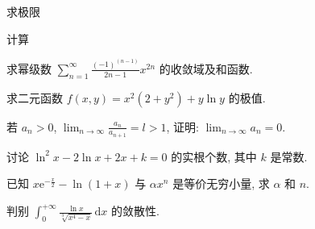 \par{}
\par{}
求极限\par
\nopagebreak[4]
\par{}
\par{}
计算\par
\nopagebreak[4]
\par{}
求幂级数 $\sum_{n=1}^{\infty} \frac{(-1)^{(n-1)}}{2n-1} x^{2n}$ 的收敛域及和函数.\par
\par{}
求二元函数 $f(x, y) = x^{2}(2 + y^{2}) + y \ln y$ 的极值.\par
\par{}
若 $a_{n} > 0$, $\lim_{n\to \infty}\frac{a_n}{a_{n + 1}} = l > 1$, 证明: $\lim_{n\to \infty}a_n = 0$.\par
\par{}
讨论 $\ln^2 x - 2\ln x + 2x + k = 0$ 的实根个数, 其中 $k$ 是常数.\par
\par{}
已知 $x \mathrm{e}^{-\frac{x}{2}} - \ln (1 + x)$ 与 $\alpha x^n$ 是等价无穷小量, 求 $\alpha$ 和 $n$.\par
\par{}
判别 $\int_0^{+\infty} \frac{\ln x}{\sqrt[3]{x^4 - x}} \, \mathrm{d}x$ 的敛散性.\par
